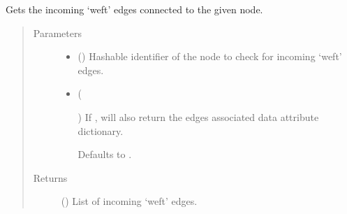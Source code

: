 \documentclass[letterpaper,10pt,english]{sphinxmanual}
\begin{document}
\begin{fulllineitems}
\begin{fulllineitems}
\label{\detokenize{cockatoo:cockatoo.KnitDiNetwork.node_weft_edges_in}}
Gets the incoming ‘weft’ edges connected to the given node.
\begin{quote}\begin{description}
\item[{Parameters}] \leavevmode\begin{itemize}
\item {} 
 () \textendash{} Hashable identifier of the node to check for incoming ‘weft’ edges.

\item {} 
 (%
\begin{footnote}[153]\sphinxAtStartFootnote
{}
%
\end{footnote}\sphinxstyleliteralemphasis{\sphinxupquote{, }}) \textendash{} 
If , will also return the edges associated data attribute
dictionary.

Defaults to .


\end{itemize}

\item[{Returns}] \leavevmode
{} () \textendash{} List of incoming ‘weft’ edges.

\end{description}\end{quote}

\end{fulllineitems}



\end{fulllineitems}
\end{document}
